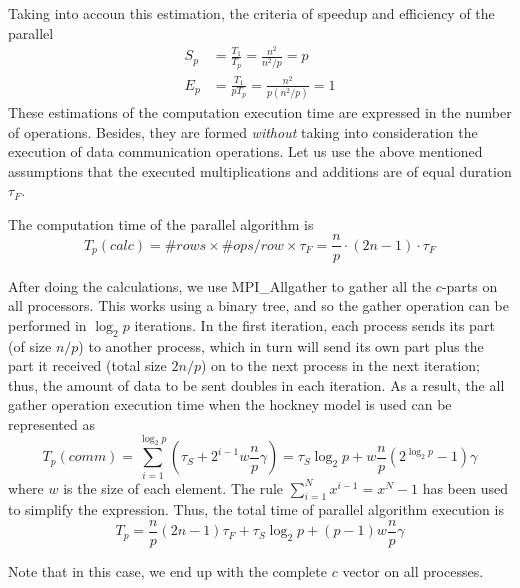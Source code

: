 Taking into accoun this estimation, the criteria of speedup and efficiency of the parallel
\begin{align}
  S_p &= \frac{T_1}{T_p} = \frac{n^2}{n^2/p} = p \\
  E_p &= \frac{T_1}{pT_p} = \frac{n^2}{p(n^2/p)} = 1
\end{align}
These estimations of the computation execution time are expressed in the number of operations. Besides, they are formed \emph{without} taking into consideration the execution of data communication operations. Let us use the above mentioned assumptions that the executed multiplications and additions are of equal duration $\tau_F$.

The computation time of the parallel algorithm is
\begin{equation}
  T_p(calc) = \# rows \times \# ops/row \times \tau_F = \frac{n}{p} \cdot (2n-1) \cdot \tau_F
\end{equation}

After doing the calculations, we use MPI\_Allgather to gather all the $c$-parts on all processors. This works using a binary tree, and so the gather operation can be performed in $\log_2 p$ iterations. In the first iteration, each process sends its part (of size $n/p$) to another process, which in turn will send its own part plus the part it received (total size $2n/p$) on to the next process in the next iteration; thus, the amount of data to be sent doubles in each iteration. As a result, the all gather operation execution time when the hockney model is used can be represented as
\begin{equation}
  T_p (comm) = \sum_{i=1}^{\log_2 p} \left( \tau_S + 2^{i-1} w \frac{n}{p} \gamma \right)
  = \tau_S\log_2 p + w \frac{n}{p} \left( 2^{\log_2 p} -1 \right) \gamma
\end{equation}
where $w$ is the size of each element. The rule $\sum_{i=1}^N x^{i-1} = x^N - 1$ has been used to simplify the expression. Thus, the total time of parallel algorithm execution is
\begin{equation}
  T_p = \frac{n}{p} (2n-1) \tau_F + \tau_S \log_2 p + (p-1) w \frac{n}{p}\gamma
\end{equation}


Note that in this case, we end up with the complete $c$ vector on all processes.


